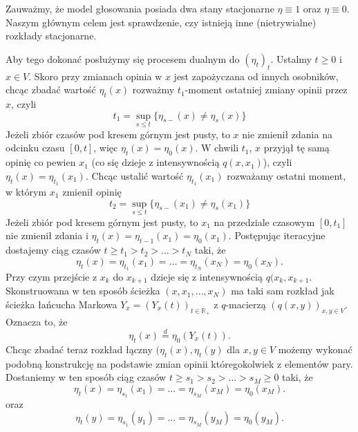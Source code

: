 \documentclass{article}
\begin{document}
Zauważmy, że model głosowania posiada dwa stany stacjonarne $\eta \equiv 1$ oraz $\eta \equiv 0$. 
Naszym głównym celem jest sprawdzenie, czy istnieją inne (nietrywialne) rozkłady stacjonarne.


Aby tego dokonać posłużymy się procesem dualnym do $(\eta_t)_t$.
Ustalmy $t \geq 0$ i $x \in V$. Skoro przy zmianach opinia w $x$ jest zapożyczana od innych 
osobników, chcąc zbadać wartość $\eta_t(x)$ rozważmy $t_1$-moment ostatniej zmiany opinii
przez $x$, czyli
\begin{equation*}
	t_1 = \sup_{s \leq t} \{ \eta_{s-}(x) \neq \eta_s(x) \}
\end{equation*}
Jeżeli zbiór czasów pod kresem górnym jest pusty, to $x$ nie zmienił zdania na odcinku
czasu $[0,t]$, więc $\eta_t(x) = \eta_0(x)$.
W chwili $t_1$, $x$ przyjął tę samą opinię co pewien $x_1$ (co się dzieje z intensywnością $q(x, x_1)$),
czyli $\eta_t(x) = \eta_{t_1}(x_1)$.
Chcąc ustalić wartość $\eta_{t_1}(x_1)$ rozważamy ostatni moment, w którym $x_1$ zmienił opinię
\begin{equation*}
	t_2 = \sup_{s \leq t} \{ \eta_{s-}(x_1) \neq \eta_s(x_1) \}
\end{equation*}
Jeżeli zbiór pod kresem górnym jest pusty, to $x_1$ na przedziale czasowym $[0,t_1]$ nie zmienił
zdania i $\eta_t(x) = \eta_{t-1}(x_1) = \eta_0(x_1)$. Postępując iteracyjne dostajemy ciąg czasów
$t\geq t_1 > t_2>\ldots >t_N$ taki, że
\begin{equation*}
	\eta_t(x) =\eta_{t_1}(x_1) = \ldots = \eta_{t_N}(x_N) = \eta_0(x_N).
\end{equation*}
Przy czym przejście z $x_k$ do $x_{k+1}$ dzieje się z intensywnością $q(x_k, x_{k+1}$.
Skonstruowana w ten sposób ścieżka $(x, x_1, \ldots, x_N)$ ma taki sam rozkład 
jak ścieżka łańcucha Markowa $Y_x = (Y_x(t))_{t \in \mathbb{R}_+}$ z $q$-macierzą 
$(q(x,y))_{x,y \in V}$. Oznacza to, że
\begin{equation*}
	\eta_t(x) \stackrel{d}{=} \eta_0(Y_x(t)).
\end{equation*}
Chcąc zbadać teraz rozkład łączny $(\eta_t(x), \eta_t(y)$ dla $x,y \in V$ możemy wykonać 
podobną konstrukcję na podstawie zmian opinii któregokolwiek z elementów pary. Dostaniemy w ten sposób 
ciąg czasów $t \geq s_1> s_2 > \ldots >s_M\geq 0$ taki, że 
\begin{equation*}
	\eta_t(x) =\eta_{s_1}(x_1) = \ldots = \eta_{s_M}(x_M) = \eta_0(x_M).	
\end{equation*}
oraz
\begin{equation*}
	\eta_t(y) =\eta_{s_1}(y_1) = \ldots = \eta_{s_M}(y_M) = \eta_0(y_M).	
\end{equation*}
\end{document}
